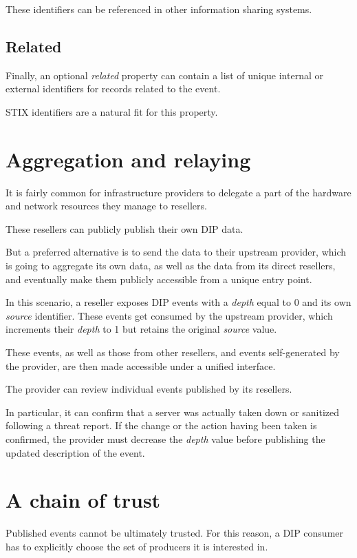\documentclass[conference]{IEEEtran}
\begin{document}
These identifiers can be referenced in other information sharing systems.

\subsection{Related}

Finally, an optional \emph{related} property can contain a list of unique internal or external identifiers for records related to the event.

STIX \cite{STIX} identifiers are a natural fit for this property.

\section{Aggregation and relaying}

It is fairly common for infrastructure providers to delegate a part of the hardware and network resources they manage to resellers.

These resellers can publicly publish their own DIP data.

But a preferred alternative is to send the data to their upstream provider, which is going to aggregate its own data, as well as the data from its direct resellers, and eventually make them publicly accessible from a unique entry point.

In this scenario, a reseller exposes DIP events with a \emph{depth} equal to 0 and its own \emph{source} identifier. These events get consumed by the upstream provider, which increments their \emph{depth} to 1 but retains the original \emph{source} value.

These events, as well as those from other resellers, and events self-generated by the provider, are then made accessible under a unified interface.

The provider can review individual events published by its resellers.

In particular, it can confirm that a server was actually taken down or sanitized following a threat report. If the change or the action having been taken is confirmed, the provider must decrease the \emph{depth} value before publishing the updated description of the event.

\section{A chain of trust}

Published events cannot be ultimately trusted. For this reason, a DIP consumer has to explicitly choose the set of producers it is interested in.
\end{document}
